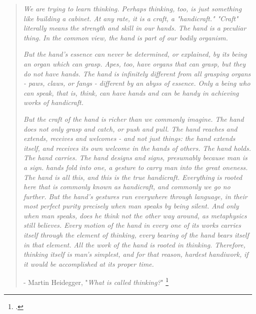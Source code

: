 \begin{quotation}
\textit{We are trying to learn thinking. Perhaps thinking, too, is just something like building a cabinet. At any rate, it is a craft, a "handicraft." "Craft" literally means the strength and skill in our hands. The hand is a peculiar thing. In the common view, the hand is part of our bodily organism.}

\textit{But the hand's essence can never be determined, or explained, by its being an organ which can grasp. Apes, too, have organs that can grasp, but they do not have hands. The hand is infinitely different from all grasping organs - paws, claws, or fangs - different by an abyss of essence. Only a being who can speak, that is, think, can have hands and can be handy in achieving works of handicraft. }

\textit{But the craft of the hand is richer than we commonly imagine. The hand does not only grasp and catch, or push and pull. The hand reaches and extends, receives and welcomes - and not just things: the hand extends itself, and receives its own welcome in the hands of others. The hand holds. The hand carries. The hand designs and signs, presumably because man is a sign. hands fold into one, a gesture to carry man into the great oneness. The hand is all this, and this is the true handicraft. Everything is rooted here that is commonly known as handicraft, and commonly we go no further. But the hand's gestures run everywhere through language, in their most perfect purity precisely when man speaks by being silent. And only when man speaks, does he think not the other way around, as metaphysics still believes. Every motion of the hand in every one of its works carries itself through the element of thinking, every bearing of the hand bears itself in that element. All the work of the hand is rooted in thinking. Therefore, thinking itself is man's simplest, and for that reason, hardest handiwork, if it would be accomplished at its proper time.}
\\

\begin{flushright}
- Martin Heidegger, "\textit{What is called thinking?}" \footcite{Heidegger1968}
\end{flushright}
\end{quotation}